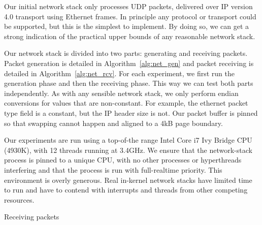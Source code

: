 Our initial network stack only processes UDP packets, delivered over IP version 4.0 transport using Ethernet frames. 
In principle any protocol or transport could be supported, but this is the simplest to implement. 
By doing so, we can get a strong indication of the practical upper bounds of any reasonable network stack. 


Our network stack is divided into two parts: generating and receiving packets. 
Packet generation is detailed in Algorithm~\ref{alg:net_gen} and packet receiving is detailed in Algorithm~\ref{alg:net_rcv}. 
For each experiment, we first run the generation phase and then the receiving phase. This way we can test both parts independently. 
As with any sensible network stack, we only perform endian conversions for values that are non-constant. 
For example, the ethernet packet type field is a constant, but the IP header size is not. 
Our packet buffer is pinned so that swapping cannot happen and aligned to a 4kB page boundary. 

Our experiments are run using a top-of-the range Intel Core i7 Ivy Bridge CPU (4930K), with 12 threads running at 3.4GHz. 
We ensure that the network-stack process is pinned to a unique CPU, with no other processes or hyperthreads interfering and that the process is run with full-realtime priority. 
This environment is overly generous. 
Real in-kernel network stacks have limited time to run and have to contend with interrupts and threads from other competing resources. 




\begin{algorithm}


\caption{Receiving packets}
\label{alg:net_rcv}
\end{algorithm}

